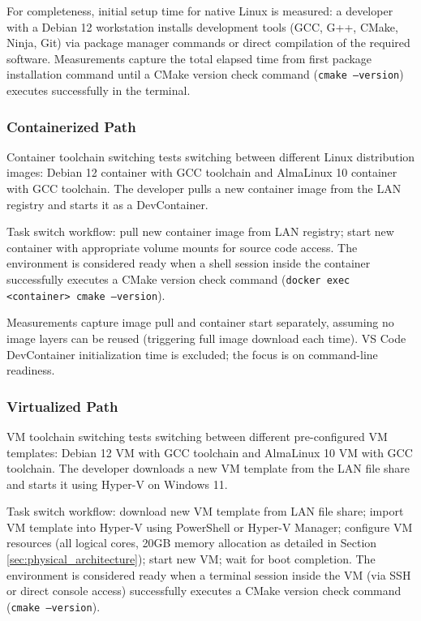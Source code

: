 For completeness, initial setup time for native Linux is measured: a developer with a Debian 12 workstation installs development tools (GCC, G++, CMake, Ninja, Git) via package manager commands or direct compilation of the required software.
Measurements capture the total elapsed time from first package installation command until a CMake version check command (\texttt{cmake --version}) executes successfully in the terminal.

\subsubsection{Containerized Path}

Container toolchain switching tests switching between different Linux distribution images: Debian 12 container with GCC toolchain and AlmaLinux 10 container with GCC toolchain.
The developer pulls a new container image from the LAN registry and starts it as a DevContainer.

Task switch workflow: pull new container image from LAN registry; start new container with appropriate volume mounts for source code access.
The environment is considered ready when a shell session inside the container successfully executes a CMake version check command (\texttt{docker exec <container> cmake --version}).

Measurements capture image pull and container start separately, assuming no image layers can be reused (triggering full image download each time).
VS Code DevContainer initialization time is excluded; the focus is on command-line readiness.

\subsubsection{Virtualized Path}

VM toolchain switching tests switching between different pre-configured VM templates: Debian 12 VM with GCC toolchain and AlmaLinux 10 VM with GCC toolchain.
The developer downloads a new VM template from the LAN file share and starts it using Hyper-V on Windows 11.

Task switch workflow: download new VM template from LAN file share; import VM template into Hyper-V using PowerShell or Hyper-V Manager; configure VM resources (all logical cores, 20GB memory allocation as detailed in Section \ref{sec:physical_architecture}); start new VM; wait for boot completion.
The environment is considered ready when a terminal session inside the VM (via SSH or direct console access) successfully executes a CMake version check command (\texttt{cmake --version}).

